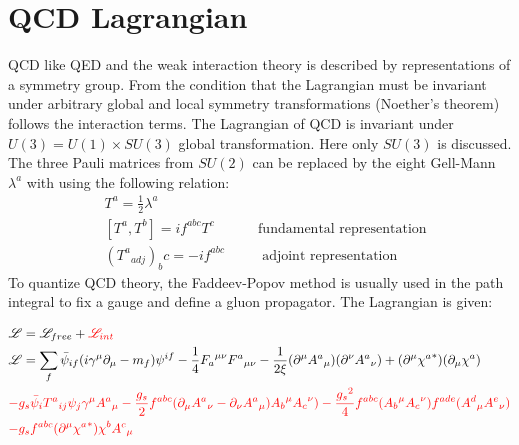 \section{QCD Lagrangian}
\label{QCD Lagrangian}

QCD like QED and the weak interaction theory is described by representations of a symmetry group. From the condition that the Lagrangian must be invariant under arbitrary global and local symmetry transformations (Noether’s theorem) follows the interaction terms.
The Lagrangian of QCD is invariant under $ U(3) = U(1) \times SU(3) $ global transformation. Here only $ SU(3) $ is discussed. The three Pauli matrices from $ SU(2) $ can be replaced by the eight Gell-Mann $ \lambda^a $ with using the following relation: 
\begin{equation}
\begin{split}
&T^a = \frac{1}{2} \lambda^a\\
&[T^a, T^b]= if^{abc} T^c \:\:\:\:\:\:\:\:\:\:\:\:\:\:\text{fundamental representation}\\
&({T^a}_{adj})_bc = -if^{abc} \:\:\:\:\:\:\:\:\:\:\:\:\text{adjoint representation}
\end{split}
\end{equation}
To quantize QCD theory, the Faddeev-Popov method \cite{Faddeev:1967fc} is usually used in the path integral to fix a gauge and define a gluon propagator. The Lagrangian is given:

\begin{equation}
\begin{split}
& \mathscr{L} = \mathscr{L}_{free}+{\color[RGB]{255,0,0} \mathscr{L}_{int}}\\
& \mathscr{L} = \sum_f \bar{\psi}_{if} (i\gamma^{\mu} {\partial}_{\mu}-m_f){\psi}^{if}-\frac{1}{4}{F_a}^{\mu \nu}{F^a}_{\mu \nu}-\frac{1}{2\xi}(\partial^{\mu} {A^a}_{\mu})(\partial^{\nu} {A^a}_{\nu})+(\partial^{\mu} {\chi^a}^*)(\partial_{\mu} {\chi^a})\\
&{\color[RGB]{255,0,0} -g_s \bar{\psi}_{i} {T^a}_{ij}{\psi}_{j} \gamma^{\mu} {A^a}_{\mu}-\frac{g_s}{2} f^{abc}(\partial_{\mu} {A^a}_{\nu}-\partial_{\nu} {A^a}_{\mu}){A_b}^{\mu}{A_c}^{\nu})-\frac{{g_s}^2}{4} f^{abc} ({A_b}^{\mu}{A_c}^{\nu})f^{ade} ({A^d}_{\mu} {A^e}_{\nu})}\\
&{\color[RGB]{255,0,0} -g_s f^{abc} (\partial^{\mu} {\chi^a}^{*}){\chi^b}{A^c}_{\mu}}\\
\end{split}
\end{equation}

